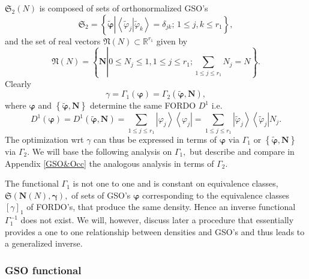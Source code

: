 \documentclass[aps,preprint]{revtex4}%
\begin{document}
$\mathfrak{S}_{2}\left(  N\right)  $ is composed of sets of orthonormalized
GSO's
\begin{equation}
\mathfrak{S}_{2}=\left\{  \mathbf{\tilde{\varphi}}\left\vert \left\langle
\left.  \tilde{\varphi}_{j}\right\vert \tilde{\varphi}_{k}\right\rangle
=\delta_{jk};\,1\leq j,k\leq r_{1}\right.  \right\}  ,
\end{equation}
and the set of real vectors $\mathfrak{N}\left(  N\right)  \subset
\mathbb{R}^{r_{1}}$ given by
\begin{equation}
\mathfrak{N}\left(  N\right)  =\left\{  \mathbf{N}\left\vert 0\leq N_{j}%
\leq1,1\leq j\leq r_{1};\sum_{1\leq j\leq r_{1}}N_{j}=N\right.  \right\}  .
\end{equation}
Clearly
\begin{equation}
\gamma=\Gamma_{1}\left(  \mathbf{\varphi}\right)  =\Gamma_{2}\left(
\mathbf{\tilde{\varphi},N}\right)  ,
\end{equation}
where $\mathbf{\varphi}$ and $\left\{  \mathbf{\tilde{\varphi},N}\right\}  $
determine the same FORDO $D^{1}$ i.e.
\begin{equation}
D^{1}\left(  \mathbf{\varphi}\right)  =D^{1}\left(  \mathbf{\tilde{\varphi}%
,N}\right)  =\sum_{1\leq j\leq r_{1}}\left\vert \varphi_{j}\right\rangle
\left\langle \varphi_{j}\right\vert =\sum_{1\leq j\leq r_{1}}\left\vert
\tilde{\varphi}_{j}\right\rangle \left\langle \tilde{\varphi}_{j}\right\vert
N_{j}.
\end{equation}
The optimization wrt $\gamma$ can thus be expressed in terms of
$\mathbf{\varphi}$ via $\Gamma_{1}$ or $\left\{  \mathbf{\tilde{\varphi}%
,N}\right\}  $ via $\Gamma_{2}.$ We will base the following analysis on
$\Gamma_{1},$ but describe and compare in Appendix \ref{GSO&Occ} the analogous
analysis in terms of $\Gamma_{2}.$

The functional $\Gamma_{1}$ is not one to one and is constant on equivalence
classes, $\mathfrak{S}\left(  \mathbf{N}\left(  N\right)  \mathbf{,\gamma
}\right)  ,$ of sets of GSO's $\mathbf{\varphi}$ corresponding to the
equivalence classes $\left[  \gamma\right]  _{1}$ of FORDO's, that produce the
same density. Hence an inverse functional $\Gamma_{1}^{-1}$ does not exist. We
will, however, discuss later a procedure that essentially provides a one to
one relationship between densities and GSO's and thus leads to a generalized inverse.

\subsubsection{GSO functional}
\end{document}
